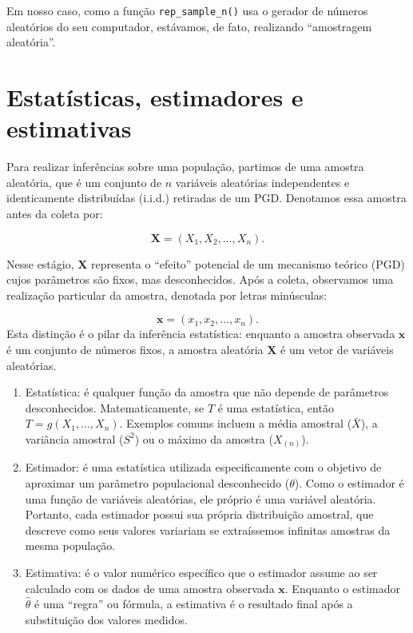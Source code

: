 \documentclass[
  letterpaper,
  DIV=11,
  numbers=noendperiod]{scrreprt}
\begin{document}
Em nosso caso, como a função \texttt{rep\_sample\_n()} usa o gerador de
números aleatórios do seu computador, estávamos, de fato, realizando
``amostragem aleatória''.

\section{Estatísticas, estimadores e
estimativas}\label{estatuxedsticas-estimadores-e-estimativas}

Para realizar inferências sobre uma população, partimos de uma amostra
aleatória, que é um conjunto de \(n\) variáveis aleatórias independentes
e identicamente distribuídas (i.i.d.) retiradas de um PGD. Denotamos
essa amostra antes da coleta por:

\[\mathbf{X}=(X_1,X_2,\ldots,X_n).\]

Nesse estágio, \(\mathbf{X}\) representa o ``efeito'' potencial de um
mecanismo teórico (PGD) cujos parâmetros são fixos, mas desconhecidos.
Após a coleta, observamos uma realização particular da amostra, denotada
por letras minúsculas:

\[\mathbf{x}=(x_1,x_2,\ldots,x_n).\] Esta distinção é o pilar da
inferência estatística: enquanto a amostra observada \(\mathbf{x}\) é um
conjunto de números fixos, a amostra aleatória \(\mathbf{X}\) é um vetor
de variáveis aleatórias.

\begin{enumerate}
\def\labelenumi{\arabic{enumi}.}
\item
  Estatística: é qualquer função da amostra que não depende de
  parâmetros desconhecidos. Matematicamente, se \(T\) é uma estatística,
  então \(T = g(X_1,\dots, X_n)\). Exemplos comuns incluem a média
  amostral (\(\bar{X}\)), a variância amostral (\(S^2\)) ou o máximo da
  amostra (\(X_{(n)}\)).
\item
  Estimador: é uma estatística utilizada especificamente com o objetivo
  de aproximar um parâmetro populacional desconhecido (\(\theta\)). Como
  o estimador é uma função de variáveis aleatórias, ele próprio é uma
  variável aleatória. Portanto, cada estimador possui sua própria
  distribuição amostral, que descreve como seus valores variariam se
  extraíssemos infinitas amostras da mesma população.
\item
  Estimativa: é o valor numérico específico que o estimador assume ao
  ser calculado com os dados de uma amostra observada \(\mathbf{x}\).
  Enquanto o estimador \(\hat \theta\) é uma ``regra'' ou fórmula, a
  estimativa é o resultado final após a substituição dos valores
  medidos.
\end{enumerate}
\end{document}
